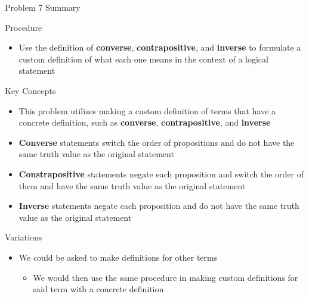 \begin{summary}{Problem 7 Summary}
    \begin{statement}{Procedure}
        \begin{itemize}
            \item Use the definition of \textbf{converse}, \textbf{contrapositive}, and \textbf{inverse} to formulate a custom definition of what each one means in the context of a logical statement
        \end{itemize}
    \end{statement}
    \begin{statement}{Key Concepts}
        \begin{itemize}
            \item This problem utilizes making a custom definition of terms that have a concrete definition, such as \textbf{converse}, \textbf{contrapositive}, and \textbf{inverse}
            \item \textbf{Converse} statements switch the order of propositions and do not have the same truth value as the original statement
            \item \textbf{Constrapositive} statements negate each proposition and switch the order of them and have the same truth value as the original statement
            \item \textbf{Inverse} statements negate each proposition and do not have the same truth value as the original statement
        \end{itemize}
    \end{statement}
    \begin{statement}{Variations}
        \begin{itemize}
            \item We could be asked to make definitions for other terms
            \begin{itemize}
                \item We would then use the same procedure in making custom definitions for said term with a concrete definition
            \end{itemize}
        \end{itemize}
    \end{statement}
\end{summary}

